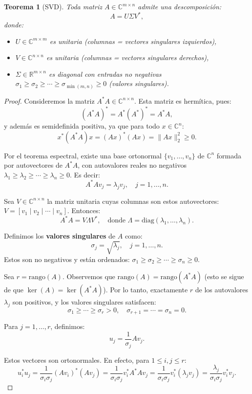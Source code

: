 \documentclass[a4paper,11pt]{report}
\newtheorem{theorem}{Teorema}[chapter]
\begin{document}
\begin{theorem}[SVD]
Toda matriz $A \in \mathbb{C}^{m \times n}$ admite una descomposición:
\[
A = U \Sigma V^*,
\]
donde:
\begin{itemize}
\item $U \in \mathbb{C}^{m \times m}$ es unitaria (columnas = vectores singulares izquierdos),
\item $V \in \mathbb{C}^{n \times n}$ es unitaria (columnas = vectores singulares derechos),
\item $\Sigma \in \mathbb{R}^{m \times n}$ es diagonal con entradas no negativas $\sigma_1 \geq \sigma_2 \geq \cdots \geq \sigma_{\min(m,n)} \geq 0$ (valores singulares).
\end{itemize}
\end{theorem}
\begin{proof}
Consideremos la matriz $A^*A \in \mathbb{C}^{n \times n}$. Esta matriz es hermítica, pues:
\[
(A^*A)^* = A^* (A^*)^* = A^*A,
\]
y además es semidefinida positiva, ya que para todo $x \in \mathbb{C}^n$:
\[
x^*(A^*A)x = (Ax)^*(Ax) = \|Ax\|_2^2 \geq 0.
\]

Por el teorema espectral, existe una base ortonormal $\{v_1, \ldots, v_n\}$ de $\mathbb{C}^n$ formada por autovectores de $A^*A$, con autovalores reales no negativos $\lambda_1 \geq \lambda_2 \geq \cdots \geq \lambda_n \geq 0$. Es decir:
\[
A^*A v_j = \lambda_j v_j, \quad j = 1, \ldots, n.
\]

Sea $V \in \mathbb{C}^{n \times n}$ la matriz unitaria cuyas columnas son estos autovectores: $V = [v_1 \mid v_2 \mid \cdots \mid v_n]$. Entonces:
\[
A^*A = V \Lambda V^*, \quad \text{donde } \Lambda = \text{diag}(\lambda_1, \ldots, \lambda_n).
\]

Definimos los \textbf{valores singulares} de $A$ como:
\[
\sigma_j = \sqrt{\lambda_j}, \quad j = 1, \ldots, n.
\]
Estos son no negativos y están ordenados: $\sigma_1 \geq \sigma_2 \geq \cdots \geq \sigma_n \geq 0$.

Sea $r = \text{rango}(A)$. Observemos que $\text{rango}(A) = \text{rango}(A^*A)$ (esto se sigue de que $\ker(A) = \ker(A^*A)$). Por lo tanto, exactamente $r$ de los autovalores $\lambda_j$ son positivos, y los valores singulares satisfacen:
\[
\sigma_1 \geq \cdots \geq \sigma_r > 0, \quad \sigma_{r+1} = \cdots = \sigma_n = 0.
\]

Para $j = 1, \ldots, r$, definimos:
\[
u_j = \frac{1}{\sigma_j} A v_j.
\]

Estos vectores son ortonormales. En efecto, para $1 \leq i, j \leq r$:
\[
u_i^* u_j = \frac{1}{\sigma_i \sigma_j} (Av_i)^* (Av_j) = \frac{1}{\sigma_i \sigma_j} v_i^* A^*A v_j = \frac{1}{\sigma_i \sigma_j} v_i^* (\lambda_j v_j) = \frac{\lambda_j}{\sigma_i \sigma_j} v_i^* v_j.
\]


\end{proof}
\end{document}
